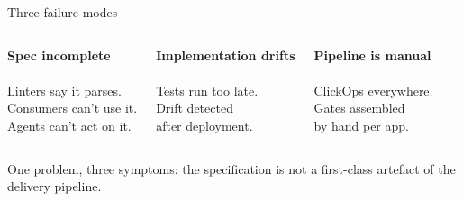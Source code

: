 \documentclass[10pt,aspectratio=169]{beamer}
\newcommand{\xmark}{\textcolor{red!70!black}{\ding{55}}}
\begin{document}
\begin{frame}{Three failure modes}

\begin{columns}[t,onlytextwidth]

\begin{center}
\textbf{\textcolor{sdtred}{Spec incomplete}}\\[1ex]
\xmark\\[1ex]
\footnotesize
Linters say it parses.\\
Consumers can't use it.\\
Agents can't act on it.
\end{center}

\begin{center}
\textbf{\textcolor{sdtred}{Implementation drifts}}\\[1ex]
\xmark\\[1ex]
\footnotesize
Tests run too late.\\
Drift detected\\
after deployment.
\end{center}

\begin{center}
\textbf{\textcolor{sdtred}{Pipeline is manual}}\\[1ex]
\xmark\\[1ex]
\footnotesize
ClickOps everywhere.\\
Gates assembled\\
by hand per app.
\end{center}

\end{columns}

\vspace{1em}
\begin{center}
\alert{One problem, three symptoms: the specification is not a
first-class artefact of the delivery pipeline.}
\end{center}

\end{frame}
\end{document}
